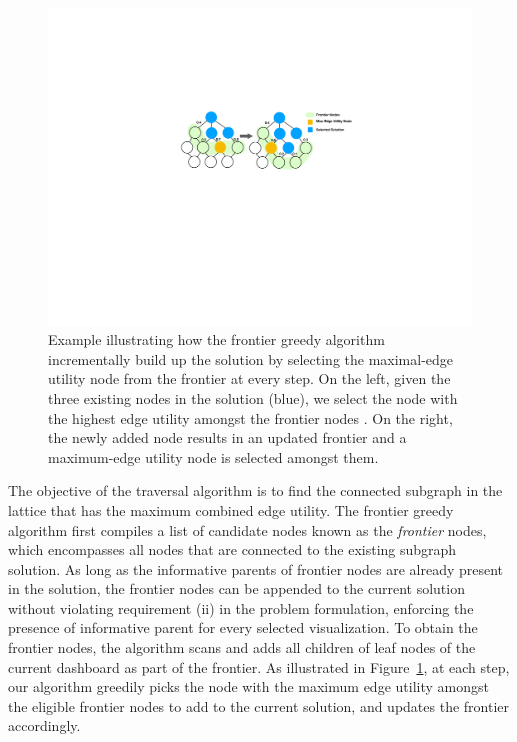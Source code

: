 \begin{figure}[h!]
\centering
\includegraphics[width=\linewidth]{figures/frontier_greedy.pdf}
\caption{Example illustrating how the frontier greedy algorithm incrementally build up the solution by selecting the maximal-edge utility node from the frontier at every step. On the left, given the three existing nodes in the solution (blue), we select the node with the highest edge utility  amongst the frontier nodes . On the right, the newly added node results in an updated frontier and a maximum-edge utility node is selected amongst them.}
\label{fig:frontier_greedy}
\end{figure}
The objective of the traversal algorithm is to find the connected subgraph in the lattice that has the maximum combined edge utility. The frontier greedy algorithm first compiles a list of candidate nodes known as the \textit{frontier} nodes, which encompasses all nodes that are connected to the existing subgraph solution. As long as the informative parents of frontier nodes are already present in the solution, the frontier nodes can be appended to the current solution without violating requirement (ii) in the problem formulation, enforcing the presence of informative parent for every selected visualization. To obtain the frontier nodes, the algorithm scans and adds all children of leaf nodes of the current dashboard as part of the frontier.  As illustrated in Figure~\ref{fig:frontier_greedy}, at each step, our algorithm greedily picks the node with the maximum edge utility amongst the eligible frontier nodes to add to the current solution, and updates the frontier accordingly. 
